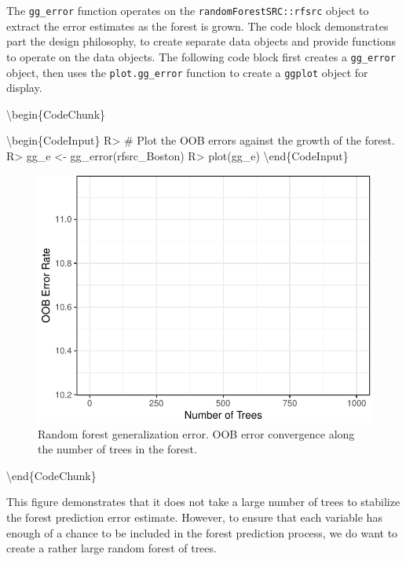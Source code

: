 \documentclass[article]{jss}
\begin{document}
The \texttt{gg\_error} function operates on the
\texttt{randomForestSRC::rfsrc} object to extract the error estimates as
the forest is grown. The code block demonstrates part the
 design philosophy, to create separate data objects
and provide functions to operate on the data objects. The following code
block first creates a \texttt{gg\_error} object, then uses the
\texttt{plot.gg\_error} function to create a \texttt{ggplot} object for
display.

\textbackslash{}begin\{CodeChunk\}

\textbackslash{}begin\{CodeInput\} R\textgreater{} \# Plot the OOB
errors against the growth of the forest. R\textgreater{} gg\_e
\textless{}- gg\_error(rfsrc\_Boston) R\textgreater{} plot(gg\_e)
\textbackslash{}end\{CodeInput\}

\begin{figure}

{\centering \includegraphics{Regression-rfsrc_files/figure-latex/error-1} 

}

\caption[Random forest generalization error]{Random forest generalization error. OOB error convergence along the number of trees in the forest.}\label{fig:error}
\end{figure}

\textbackslash{}end\{CodeChunk\}

This figure demonstrates that it does not take a large number of trees
to stabilize the forest prediction error estimate. However, to ensure
that each variable has enough of a chance to be included in the forest
prediction process, we do want to create a rather large random forest of
trees.
\end{document}
